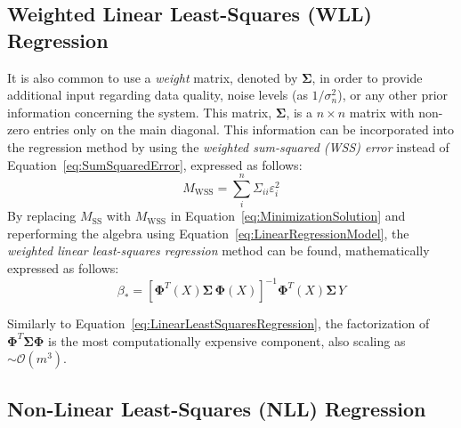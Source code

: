 \documentclass{article}
\begin{document}
\subsection{Weighted Linear Least-Squares (WLL) Regression}
\label{subsec:WeightedLinearLeastSquares}

It is also common to use a \emph{weight} matrix, denoted by $\mathbf{\Sigma}$, in order to provide additional input regarding data quality, noise levels (as $1/\sigma_n^2$), or any other prior information concerning the system. This matrix, $\mathbf{\Sigma}$, is a $n \times n$ matrix with non-zero entries only on the main diagonal. This information can be incorporated into the regression method by using the \emph{weighted sum-squared (WSS) error} instead of Equation~\eqref{eq:SumSquaredError}, expressed as follows:
\begin{equation}
\label{eq:WeightedSumSquaredError}
	M_{\text{WSS}} = \sum_{i}^{n} \Sigma_{ii} \varepsilon_i^2
\end{equation}
By replacing $M_{\text{SS}}$ with $M_{\text{WSS}}$ in Equation~\eqref{eq:MinimizationSolution} and reperforming the algebra using Equation~\eqref{eq:LinearRegressionModel}, the \emph{weighted linear least-squares regression} method can be found, mathematically expressed as follows:
\begin{equation}
\label{eq:WeightedLinearLeastSquaresRegression}
	\beta_* = \left[\mathbf{\Phi}^T\!\left(X\right) \mathbf{\Sigma} \, \mathbf{\Phi}\!\left(X\right)\right]^{-1} \mathbf{\Phi}^T\!\left(X\right) \mathbf{\Sigma} \, Y
\end{equation}

Similarly to Equation~\eqref{eq:LinearLeastSquaresRegression}, the factorization of $\mathbf{\Phi}^T\mathbf{\Sigma}\mathbf{\Phi}$ is the most computationally expensive component, also scaling as $\sim\mathcal{O}\!\left(m^3\right)$.

\subsection{Non-Linear Least-Squares (NLL) Regression}
\label{subsec:NonLinearLeastSquares}
\end{document}
